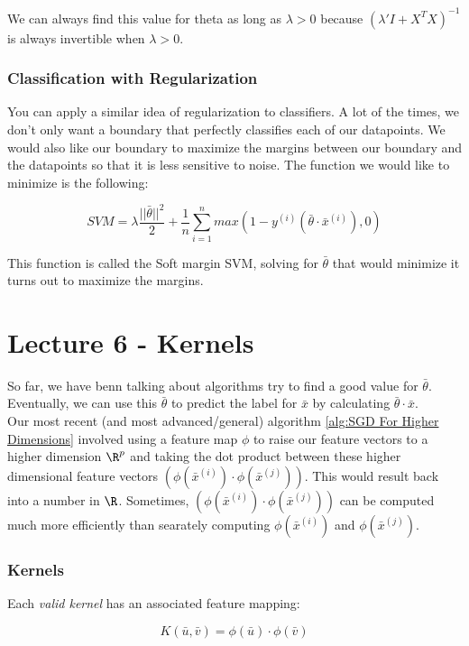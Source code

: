 \documentclass[12pt]{article}
\begin{document}
We can always find this value for theta as long as $\lambda > 0$ because $(\lambda' I + X^TX)^{-1}$ is always invertible when $\lambda > 0$.

\section{Classification with Regularization}

You can apply a similar idea of regularization to classifiers. A lot of the times, we don't only want a boundary that perfectly classifies each of our datapoints. We would also like our boundary to maximize the margins between our boundary and the datapoints so that it is less sensitive to noise. The function we would like to minimize is the following:

\[SVM = \lambda \frac {||\bar{\theta}||^2} 2 + \frac 1 n \sum_{i=1}^n max(1 - y^{(i)}(\bar{\theta} \cdot \bar{x}^{(i)}), 0) \]

This function is called the Soft margin SVM, solving for $\bar{\theta}$ that would minimize it turns out to maximize the margins.

\part{Lecture 6 - Kernels}

So far, we have benn talking about algorithms try to find a good value for $\bar{\theta}$. Eventually, we can use this $\bar{\theta}$ to predict the label for $\bar x$ by calculating $\bar{\theta} \cdot \bar x$.\\

Our most recent (and most advanced/general) algorithm \ref{alg:SGD For Higher Dimensions} involved using a feature map $\phi$ to raise our feature vectors to a higher dimension $\R^p$ and taking the dot product between these higher dimensional feature vectors $(\phi(\bar x^{(i)}) \cdot \phi(\bar x^{(j)}))$. This would result back into a number in $\R$. Sometimes, $(\phi(\bar x^{(i)}) \cdot \phi(\bar x^{(j)}))$ can be computed much more efficiently than searately computing $\phi(\bar x^{(i)})$ and $\phi(\bar x^{(j)})$.

\section{Kernels}

Each \emph{valid kernel} has an associated feature mapping:

\[ K(\bar u, \bar v) = \phi(\bar u) \cdot \phi(\bar v)\]
\end{document}
